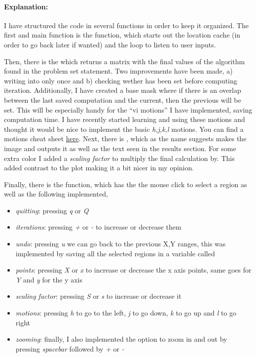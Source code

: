 
\paragraph{Explanation:}
I have structured the code in several functions in order to keep it organized.
The first and main function is the  function, which starts out the location cache (in order to go back later if wanted) and the loop to listen to user inputs.

Then, there is the  which returns a matrix with the final values of the algorithm found in the problem set statement.
Two improvements have been made, a) writing into  only once and b) checking wether  has been set before computing iteration.
Additionally, I have created a base mask where if there is an overlap between the last saved computation and the current, then the previous will be set.
This will be especially handy for the ``vi motions'' I have implemented, saving computation time.
I have recently started learning and using these motions and thought it would be nice to implement the basic \textit{h,j,k,l} motions.
You can find a motions cheat sheet \href{https://vim.rtorr.com}{here}.
Next, there is , which as the name suggests makes the image and outputs it as well as the text seen in the results section.
For some extra color I added a \textit{scaling factor} to multiply the final calculation by.
This added contrast to the plot making it a bit nicer in my opinion.

Finally, there is the  function, which has the the mouse click to select a region as well as the following implemented,
\begin{itemize}
    \item \textit{quitting}: pressing \textit{q} or \textit{Q}
    \item \textit{iterations}: pressing \textit{+} or \textit{-} to increase or decrease them 
    \item \textit{undo}: pressing \textit{u} we can go back to the previous X,Y ranges, this was implemented by saving all the selected regions in a variable called 
    \item \textit{points}: pressing \textit{X} or \textit{x} to increase or decrease the x axis points, same goes for \textit{Y} and \textit{y} for the y axis
    \item \textit{scaling factor}: pressing \textit{S} or \textit{s} to increase or decrease it
    \item \textit{motions}: pressing \textit{h} to go to the left, \textit{j} to go down, \textit{k} to go up and \textit{l} to go right
    \item \textit{zooming}: finally, I also implemented the option to zoom in and out by pressing \textit{spacebar} followed by \textit{+} or \textit{-}

\end{itemize}

